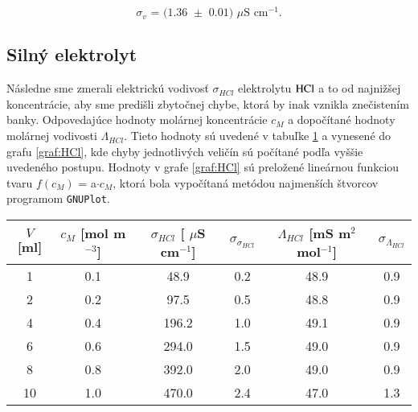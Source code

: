 \documentclass{article}
\begin{document}
$$\text{${\sigma}_v$ = (1.36 $\pm$ 0.01) $\mu$S cm$^{-1}$.}$$

\subsection{Silný elektrolyt}
Následne sme zmerali elektrickú vodivosť ${\sigma}_{HCl}$ elektrolytu $\ce{HCl}$ a to od najnižšej koncentrácie, aby sme predišli zbytočnej chybe, ktorá by inak vznikla znečistením banky. Odpovedajúce hodnoty molárnej koncentrácie $c_M$ a dopočítané hodnoty molárnej vodivosti ${\Lambda}_{HCl}$. Tieto hodnoty sú uvedené v tabuľke \ref{tab:HCl} a vynesené do grafu \ref{graf:HCl}, kde chyby jednotlivých veličín sú počítané podľa vyššie uvedeného postupu. Hodnoty v grafe \ref{graf:HCl} sú preložené lineárnou funkciou tvaru $f(c_M)$ = a${\cdot}c_M$, ktorá bola vypočítaná metódou najmenších štvorcov programom \texttt{GNUPlot}. 

\begin{table}[!htbp]
\centering
\label{tab:HCl}
\begin{tabular}{|c|c|c|c|c|c|}
\hline
$V$ [ml] & $c_M$ [mol m$^{-3}$] & ${\sigma}_{HCl}$ [ $\mu$S cm$^{-1}$] &  ${\sigma}_{{\sigma}_{HCl}}$   & ${\Lambda}_{HCl}$ [mS m$^2$ mol$^{-1}$] & ${\sigma}_{{\Lambda}_{HCl}}$    \\ \hline
1      & 0.1                  & 48.9                                 & 0.2 & 48.9                                    & 0.9 \\ \hline
2      & 0.2                  & 97.5                                 & 0.5 & 48.8                                    & 0.9 \\ \hline
4      & 0.4                  & 196.2                                & 1.0 & 49.1                                    & 0.9 \\ \hline
6      & 0.6                  & 294.0                                & 1.5 & 49.0                                    & 0.9 \\ \hline
8      & 0.8                  & 392.0                                & 2.0 & 49.0                                    & 0.9 \\ \hline
10     & 1.0                  & 470.0                                & 2.4 & 47.0                                    & 1.3 \\ \hline
\end{tabular}
\end{table}
\end{document}
